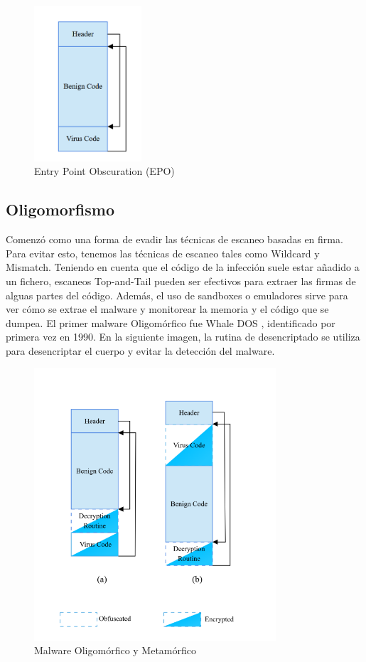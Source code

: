 \documentclass[15pt]{article}
\begin{document}
	\begin{figure}[h]
		\centering
		\includegraphics[width=4cm]{images/EPO.png}
		\caption{Entry Point Obscuration (EPO)}
	\end{figure}
	
	
	\subsection{Oligomorfismo}
	
	Comenzó como una forma de evadir las técnicas de escaneo basadas en firma. Para evitar esto, tenemos las técnicas de escaneo tales como Wildcard y Mismatch. Teniendo en cuenta que el código de la infección suele estar añadido a un fichero, escaneos Top-and-Tail pueden ser efectivos para extraer las firmas de alguas partes del código. Además, el uso de sandboxes o emuladores sirve para ver cómo se extrae el malware y monitorear la memoria y el código que se dumpea. El primer malware Oligomórfico fue Whale DOS \cite{whale}, identificado por primera vez en 1990. En la siguiente imagen, la rutina de desencriptado se utiliza para desencriptar el cuerpo y evitar la detección del malware.
	
	\begin{figure}[H]
		\centering
		\includegraphics[width=9cm]{images/oligomorphism.png}
		\caption{Malware Oligomórfico y Metamórfico}
	\end{figure}	
\end{document}
